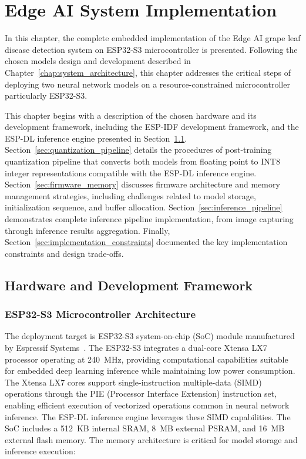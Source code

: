 \chapter{Edge AI System Implementation}
\label{chap:deployment}

In this chapter, the complete embedded implementation of the Edge AI grape leaf disease detection system on ESP32-S3 microcontroller is presented. Following the chosen models design and development described in Chapter~\ref{chap:system_architecture}, this chapter addresses the critical steps of deploying two neural network models on a resource-constrained microcontroller particularly ESP32-S3.


This chapter begins with a description of the chosen hardware and its development framework, including the ESP-IDF development framework,
and the ESP-DL inference engine presented in Section~\ref{sec:hw_platform}. Section~\ref{sec:quantization_pipeline} details the procedures of post-training quantization pipeline that converts both models from floating point to INT8 integer representations compatible with the ESP-DL inference engine. Section~\ref{sec:firmware_memory}  discusses firmware architecture and memory management strategies, including challenges related to model storage, initialization sequence, and buffer allocation. Section~\ref{sec:inference_pipeline} demonstrates complete inference pipeline implementation, from image capturing through inference results aggregation. Finally, Section~\ref{sec:implementation_constraints} documented the key implementation constraints and design trade-offs.

\section{Hardware and Development Framework}
\label{sec:hw_platform}

\subsection{ESP32-S3 Microcontroller Architecture}
\label{subsec:esp32s3_architecture}
The deployment target is ESP32-S3 system-on-chip (SoC) module manufactured by Espressif Systems~\cite{esp32s3_datasheet}. The ESP32-S3 integrates a dual-core Xtensa LX7 processor operating at 240~MHz, providing computational capabilities suitable for embedded deep learning inference while maintaining low power consumption. The Xtensa LX7 cores support single-instruction multiple-data (SIMD) operations through the PIE (Processor Interface Extension) instruction set, enabling efficient execution of vectorized operations common in neural network inference. The ESP-DL inference engine leverages these SIMD capabilities. The SoC includes a 512~KB internal SRAM, 8~MB external PSRAM, and 16~MB external flash memory. The memory architecture is critical for model storage and inference execution:

